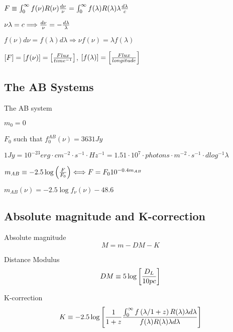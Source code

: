 $F \equiv \int^{\infty}_0 f(\nu)R(\nu){d\nu \over \nu} = \int^{\infty}_0 f(\lambda)R(\lambda)\lambda {d\lambda \over c}$ 
\citep{Hogg1996}

$\nu \lambda = c \Longrightarrow {d\nu \over \nu} = -{d\lambda \over \lambda}$

$f(\nu)d\nu =f(\lambda)d\lambda \Longrightarrow \nu f(\nu) = \lambda f(\lambda)$

$[F] = [f(\nu)] = \left[{ Flux \over time^{-1}} \right]$, $[f(\lambda)] = \left[{ Flux \over longitude} \right]$

\subsection{The AB Systems}

The AB system \citep{Oke1970} 

$m_0 = 0$

$F_0$ such that $f^{AB}_{0}(\nu) = 3631Jy$

$1Jy = 10^{-23}erg \cdot cm^{-2} \cdot s^{-1} \cdot Hz^{-1} = 1.51 \cdot 10^7 \cdot photons \cdot m^{-2} \cdot s^{-1} \cdot dlog^{-1}\lambda$

$m_{AB} \equiv -2.5 \log \left({F \over F_0}\right) \Longleftrightarrow F = F_0 10^{-0.4m_{AB}}$

$m_{AB}(\nu) = -2.5 \log f_{\nu}(\nu) - 48.6$ \citep{Oke1982}



\subsection{Absolute magnitude and K-correction}

Absolute magnitude 
\begin{equation}
M = m - DM - K
\end{equation}

Distance Modulus 
\begin{equation}
DM \equiv 5 \log \left[{D_L \over 10pc} \right]
\end{equation}

K-correction 
\begin{equation}
K \equiv -2.5 \log \left[{1 \over 1+z}{\int^{\infty}_{0} f\left( \lambda / 1+z \right)R(\lambda)\lambda d\lambda \over f(\lambda)R(\lambda)\lambda d\lambda}\right]
\end{equation}

